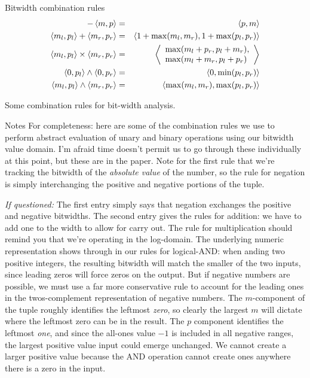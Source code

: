\documentclass[%
pdf,
colorBG,
slideColor,
nototal,
oqe
]{prosper}
\newenvironment{talknotes}{\begin{slide}{Notes}\tiny}{\end{slide}}
\begin{document}
\begin{slide}{Bitwidth combination rules}
\begin{eqnarray*}
-\left\langle m,p \right\rangle &=& \left\langle p,m \right\rangle\\
\left\langle m_l,p_l \right\rangle + \left\langle m_r,p_r \right\rangle &=& \left\langle 1+\max(m_l,m_r),1+\max(p_l,p_r) \right\rangle\\
\left\langle m_l,p_l \right\rangle \times \left\langle m_r,p_r \right\rangle &=&
\left\langle \begin{array}{l}\max(m_l+p_r,p_l+m_r),\\
                       \max(m_l+m_r,p_l+p_r)\end{array} \right\rangle\\
\left\langle 0,p_l \right\rangle \wedge \left\langle 0,p_r \right\rangle &=& \left\langle 0,\min(p_l,p_r) \right\rangle\\
\left\langle m_l,p_l \right\rangle\wedge \left\langle m_r,p_r \right\rangle &=& \left\langle \max(m_l,m_r),\max(p_l,p_r) \right\rangle
\end{eqnarray*}

Some combination rules for bit-width analysis.
\end{slide}

\begin{talknotes}
For completeness: here are some of the combination rules we use to
perform abstract evaluation of unary and binary operations using
our bitwidth value domain.  I'm afraid time doesn't permit us to go
through these individually at this point, but these are in the paper.
Note for the first rule that we're tracking the bitwidth of the
\textit{absolute value} of the number, so the rule for negation is
simply interchanging the positive and negative portions of the tuple.

\textit{If questioned:}
The first entry simply says that negation
exchanges the positive and negative bitwidths.  The second entry gives
the rules for addition: we have to add one to the width to allow for
carry out.  The rule for multiplication should remind you that we're
operating in the log-domain.  The underlying numeric representation
shows through in our rules for logical-AND: when anding two positive
integers, the resulting bitwidth will match the smaller of the two
inputs, since leading zeros will force zeros on the output.  But
if negative numbers are possible, we must use a far more conservative
rule to account for the leading ones in the twos-complement
representation of negative numbers.  The $m$-component of the tuple
roughly identifies the leftmost \emph{zero}, so clearly the largest
$m$ will dictate where the leftmost zero can be in the result.
The $p$ component identifies the leftmost \emph{one}, and since
the all-ones value $-1$ is included in all negative ranges, the
largest positive value input could emerge unchanged.  We cannot create
a larger positive value because the AND operation cannot create ones
anywhere there is a zero in the input.

~%
\end{talknotes}
\end{document}
